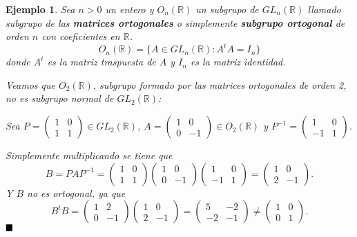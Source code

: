 \documentclass[12pt]{article}
\newtheorem{example}{Ejemplo}[theorem]
\begin{document}
\begin{example} Sea $n>0$ un entero y $O_{n}(\mathbb{R})$ un subgrupo de $GL_{n}(\mathbb{R})$ llamado subgrupo de las \textbf{matrices ortogonales} o simplemente \textbf{subgrupo ortogonal} de orden $n$ con coeficientes en $\mathbb{R}$. $$O_{n}(\mathbb{R}) = \lbrace A \in GL_{n}(\mathbb{R}):A^{t}A = I_{n}\rbrace$$ donde $A^{t}$ es la matriz traspuesta de $A$ y $I_{n}$ es la matriz identidad.

Veamos que $O_{2}(\mathbb{R})$, subgrupo formado por las matrices ortogonales de orden 2, no es subgrupo normal de $GL_{2}(\mathbb{R})$:
\begin{center}
Sea $P = \left(
\begin{matrix}
1 & 0 \\
1 & 1
\end{matrix}
\right) \in GL_{2}(\mathbb{R})$, \hspace{0.1cm} $A =\left(
\begin{matrix}
1 & 0 \\
0 & -1
\end{matrix}
\right) \in O_{2}(\mathbb{R})$ y \hspace{0.1cm }$P^{-1} = \left(
\begin{matrix}
1 & 0 \\
-1 & 1
\end{matrix}
\right)$.\\
\end{center}
Simplemente multiplicando se tiene que $$B = PAP^{-1} = \left(
\begin{matrix}
1 & 0 \\
1 & 1
\end{matrix}
\right) \left(
\begin{matrix}
1 & 0 \\
0 & -1
\end{matrix}
\right)\left(
\begin{matrix}
1 & 0 \\
-1 & 1
\end{matrix}
\right) = \left(
\begin{matrix}
1 & 0 \\
2 & -1
\end{matrix}
\right).$$
Y $B$ no es ortogonal, ya que $$B^{t}B = \left(
\begin{matrix}
1 & 2 \\
0 & -1
\end{matrix}
\right)\left(
\begin{matrix}
1 & 0 \\
2 & -1
\end{matrix}
\right)= \left(
\begin{matrix}
5 & -2 \\
-2 & -1
\end{matrix}
\right) \neq \left(
\begin{matrix}
1 & 0 \\
0 & 1
\end{matrix}
\right).$$
$\hfill \blacksquare$
\end{example}
\end{document}
